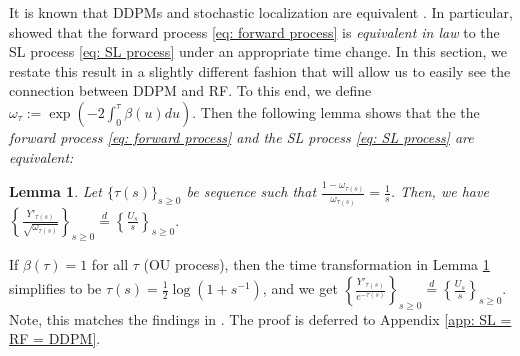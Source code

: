\documentclass{article}
\theoremstyle{plain}
\newtheorem{lemma}[theorem]{Lemma}
\theoremstyle{definition}
\theoremstyle{remark}
\newcommand{\bc}[1]{\left\{{#1}\right\}}
\begin{document}
It is known that DDPMs and stochastic localization are equivalent \citep{montanari2023sampling}. 
In particular, \citet{benton2023nearly}  showed that the forward process \eqref{eq: forward process} is \textit{equivalent in law} to the SL process \eqref{eq: SL process} under an appropriate time change. In this section, we restate this result in a slightly different fashion that will allow us to easily see the connection between DDPM and RF.   
To this end, we define  $\omega_{\tau} := \exp(-2 \int_0^\tau \beta(u) du)$. Then the following lemma shows that the the \textit{forward process \eqref{eq: forward process} and the SL process \eqref{eq: SL process} are equivalent:}
\begin{lemma}
\label{lemma: time change DDPM-SL}
    Let $\{\tau(s)\}_{s \ge 0}$ be sequence such that $\frac{1 -\omega_{\tau(s)}}{\omega_{\tau(s)}} = \frac{1}{s}$. Then, we have 
    $\bc{\frac{Y'_{\tau(s)}}{\sqrt{\omega_{\tau(s)}}}}_{s\ge 0} \overset{d}{= } \bc{\frac{U_s}{s}}_{s \ge 0}.$
\end{lemma}
If $\beta(\tau) = 1$ for all $\tau$ (OU process), then the time transformation in Lemma \ref{lemma: time change DDPM-SL} simplifies to be $\tau(s)  = \frac{1}{2}\log(1 + s^{-1})$, and we get $\bc{\frac{Y'_{\tau(s)}}{e^{- \tau(s)}}}_{s\ge 0} \overset{d}{= } \bc{\frac{U_s}{s}}_{s \ge 0}$. Note, this matches the findings in \citet[Section 1.2]{benton2023nearly}. The proof is deferred to Appendix \ref{app: SL = RF = DDPM}.
\end{document}
